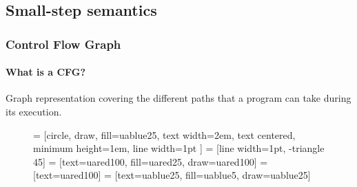 \subsection{Small-step semantics}


\begin{frame}[fragile]
\frametitle{Control Flow Graph}
\framesubtitle{What is a CFG?}

Graph representation covering the different paths that a program can take during its execution.


\begin{figure}
\centering
{} = [circle, draw, fill=uablue25, 
    text width=2em, text centered, minimum height=1em, line width=1pt ]
 = [line width=1pt, -triangle 45]
 = [text=uared100, fill=uared25, draw=uared100]
 = [text=uared100]
 = [text=uablue25, fill=uablue5, draw=uablue25]

\end{figure}



\end{frame}
